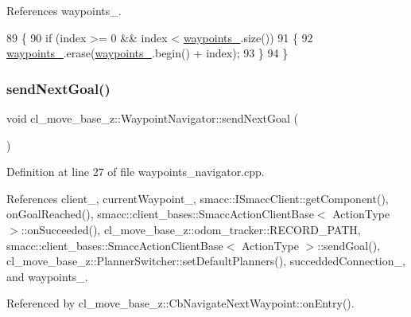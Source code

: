 References waypoints\+\_\+.


\begin{DoxyCode}
89 \{
90   \textcolor{keywordflow}{if} (index >= 0 && index < \hyperlink{classcl__move__base__z_1_1WaypointNavigator_a727f6a73e15ff5dc6bb3ffdf52c3d832}{waypoints\_}.size())
91   \{
92     \hyperlink{classcl__move__base__z_1_1WaypointNavigator_a727f6a73e15ff5dc6bb3ffdf52c3d832}{waypoints\_}.erase(\hyperlink{classcl__move__base__z_1_1WaypointNavigator_a727f6a73e15ff5dc6bb3ffdf52c3d832}{waypoints\_}.begin() + index);
93   \}
94 \}
\end{DoxyCode}
\mbox{\label{classcl__move__base__z_1_1WaypointNavigator_a1e0a8ff536d2d01a01063fd903029347}} 
\subsubsection{\texorpdfstring{send\+Next\+Goal()}{sendNextGoal()}}
{\footnotesize\ttfamily void cl\+\_\+move\+\_\+base\+\_\+z\+::\+Waypoint\+Navigator\+::send\+Next\+Goal (\begin{DoxyParamCaption}{ }\end{DoxyParamCaption})}



Definition at line 27 of file waypoints\+\_\+navigator.\+cpp.



References client\+\_\+, current\+Waypoint\+\_\+, smacc\+::\+I\+Smacc\+Client\+::get\+Component(), on\+Goal\+Reached(), smacc\+::client\+\_\+bases\+::\+Smacc\+Action\+Client\+Base$<$ Action\+Type $>$\+::on\+Succeeded(), cl\+\_\+move\+\_\+base\+\_\+z\+::odom\+\_\+tracker\+::\+R\+E\+C\+O\+R\+D\+\_\+\+P\+A\+TH, smacc\+::client\+\_\+bases\+::\+Smacc\+Action\+Client\+Base$<$ Action\+Type $>$\+::send\+Goal(), cl\+\_\+move\+\_\+base\+\_\+z\+::\+Planner\+Switcher\+::set\+Default\+Planners(), succedded\+Connection\+\_\+, and waypoints\+\_\+.



Referenced by cl\+\_\+move\+\_\+base\+\_\+z\+::\+Cb\+Navigate\+Next\+Waypoint\+::on\+Entry().


